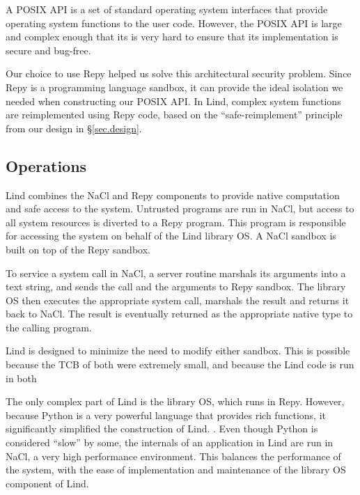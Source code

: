 A POSIX API is a set of standard operating system interfaces that provide operating system functions
to the user code. However, the POSIX API is large and complex enough that its is
very hard to ensure that its implementation is secure and bug-free.

Our choice to use Repy helped us solve this architectural security problem.
Since Repy is a programming language sandbox, it can provide the ideal isolation
we needed when constructing our POSIX API. In Lind,
complex system functions are reimplemented using Repy code,
based on the ``safe-reimplement'' principle from our design in \S{\ref{sec.design}}.

\subsection{Operations}

Lind combines the NaCl and Repy components to provide native computation and
safe access to the system. Untrusted programs are run in NaCl,
but access to all system resources is diverted to a Repy program.
This program is responsible for accessing the system on behalf of the Lind library
 OS. A NaCl sandbox is built on top of the Repy sandbox.

To service a system call in NaCl, a server routine marshals its arguments into a text string,
and sends the call and the arguments to Repy sandbox.
The library OS then executes the appropriate system call, marshals the result and
returns it back to NaCl. The result is eventually returned as the appropriate native type to the calling program.

Lind is designed to minimize the need to modify either sandbox. This is possible
because the TCB of both were extremely small, and because the Lind code is run
in both

The only complex part of Lind is the library OS, which runs in Repy.
However, because Python is a very powerful language that provides rich functions,
it significantly simplified the construction of Lind. . Even though Python is considered ``slow'' by some,
the internals of an application in Lind are run in NaCl, a very high performance
environment. 
This balances the performance of the system, with the ease of implementation and maintenance
of the library OS component of Lind.

